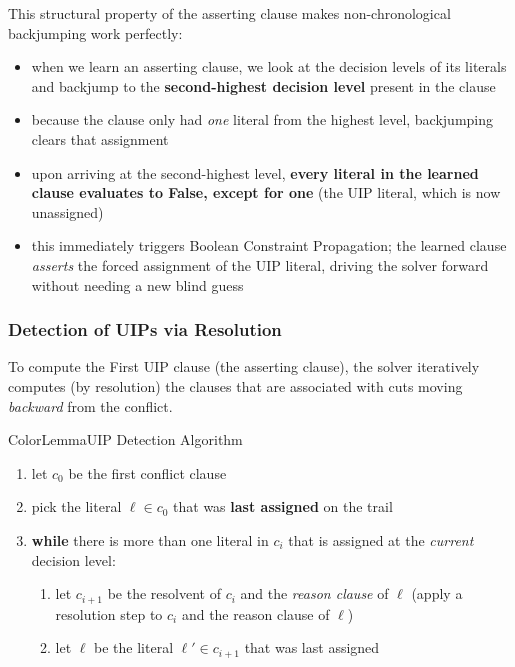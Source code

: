 \documentclass[a4paper, 11pt]{report}
\begin{document}
    This structural property of the asserting clause makes non-chronological backjumping work perfectly:
    \begin{itemize}
        \item when we learn an asserting clause, we look at the decision levels of its literals and backjump to the \textbf{second-highest decision level} present in the clause
        \item because the clause only had \textit{one} literal from the highest level, backjumping clears that assignment
        \item upon arriving at the second-highest level, \textbf{every literal in the learned clause evaluates to False, except for one} (the UIP literal, which is now unassigned)
        \item this immediately triggers Boolean Constraint Propagation; the learned clause \textit{asserts} the forced assignment of the UIP literal, driving the solver forward without needing a new blind guess
\end{itemize}


\subsubsection*{Detection of UIPs via Resolution}

To compute the First UIP clause (the asserting clause), the solver iteratively computes (by resolution) the clauses that are associated with cuts moving \textit{backward} from the conflict.

\begin{cframe}{ColorLemma}{UIP Detection Algorithm}
    \vspace{-1em}
\begin{enumerate}
    \item let $c_0$ be the first conflict clause
    \item pick the literal $\ell \in c_0$ that was \textbf{last assigned} on the trail
    \item \textbf{while} there is more than one literal in $c_i$ that is assigned at the \textit{current} decision level:
    \begin{enumerate}
        \item let $c_{i+1}$ be the resolvent of $c_i$ and the \textit{reason clause} of $\ell$ (apply a resolution step to $c_{i}$ and the reason clause of $\ell$)
        \item let $\ell$ be the literal $\ell' \in c_{i+1}$ that was last assigned
    \end{enumerate}
\end{enumerate}
\end{cframe}
\end{document}
